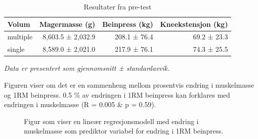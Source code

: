 \documentclass[
  letterpaper,
  DIV=11,
  numbers=noendperiod]{scrreprt}
\begin{document}
\begingroup
\fontsize{12.0pt}{14.4pt}\selectfont
\setlength{\LTpost}{0mm}

\begin{longtable}{lrrr}

\caption{\label{tbl-pre}Resultater fra pre-test}

\tabularnewline

\toprule
Volum & Magermasse (g) & Beinpress (kg) & Kneekstensjon (kg) \\ 
\midrule\addlinespace[2.5pt]
multiple & 8,603.5 ± 2,032.9 & 208.1 ± 76.4 & 69.2 ± 23.3 \\ 
single & 8,589.0 ± 2,021.0 & 217.9 ± 76.1 & 74.3 ± 25.5 \\ 
\bottomrule

\end{longtable}

\begin{minipage}{\linewidth}
\emph{Data er presentert som gjennomsnitt ± standardavvik.}\\
\end{minipage}
\endgroup

Figuren viser om det er en sammenheng mellom prosentvis endring i
muskelmasse og 1RM beinpress. 0.5 \% av endringen i 1RM beinpress kan
forklares med endringen i muskelmasse (R = 0.005 \& p = 0.59).

\begin{figure}[H]


\caption{\label{fig-figur1}Figur som viser en lineær regresjonsmodell
med endring i muskelmasse som prediktor variabel for endring i 1RM
beinpress.}

\end{figure}%
\end{document}
